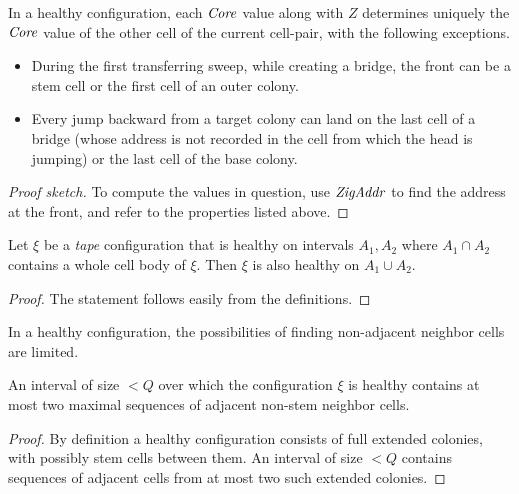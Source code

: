\documentclass[11pt]{memoir}
\theoremstyle{definition} %
\newtheorem{Premark}{\color{cyan}Peter remark}
\newenvironment{premark}{\begin{Premark}\color{cyan}}{\varqed\end{Premark}}
\newcommand{\fld}[1]{\ensuremath{\textit{#1\/}}}
\newcommand{\Q}{Q} %
\newcommand{\Z}{Z} %
\newcommand{\Core}{\fld{Core}}
\newcommand{\ZigAddr}{\fld{ZigAddr}}
\begin{document}
\begin{lemma}\label{lem:coordination1}
  In a healthy configuration, each \( \Core \) 
  value along with \( \Z \) determines uniquely the 
  \( \Core \) value of the other cell of the current cell-pair, with the following exceptions.
  \begin{itemize}
  \item During the first transferring sweep, while
    creating a bridge, the front can be a stem cell or the first cell of an outer colony.
  \item Every jump backward from a target colony can land on the last cell of a 
    bridge (whose address is not recorded in the cell from which the head is jumping)
    or the last cell of the base colony.
  \end{itemize}
  \end{lemma}
  \begin{proof}[Proof sketch]
  To compute the values in question, use \( \ZigAddr \) to find the address at the front, and
  refer to the properties listed above.
  \end{proof}

\begin{lemma}\label{lem:health-extension}
  Let \( \xi \) be a \emph{tape} configuration that is healthy on intervals \( A_{1}, A_{2} \) 
where \( A_{1}\cap A_{2} \) contains a whole cell body of \( \xi \).
Then \( \xi \) is also healthy on \( A_{1}\cup A_{2} \).
\end{lemma}
\begin{proof}
  The statement follows easily from the definitions.
\end{proof}

In a healthy configuration, the possibilities of finding non-adjacent neighbor
cells are limited.

\begin{lemma}\label{lem:two-domains}
  An interval of size \( <\Q \) over which the configuration \( \xi \) is healthy
contains at most two maximal sequences of adjacent non-stem neighbor cells.
\end{lemma}
\begin{proof}
By definition a healthy configuration consists of full extended colonies, with 
possibly stem cells between them.
An interval of size \( <\Q \) contains sequences of adjacent cells 
from at most two such extended colonies.
\end{proof}
\end{document}
